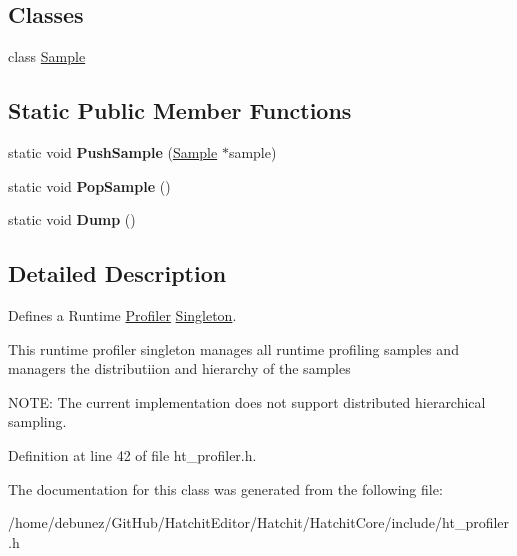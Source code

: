 \subsection*{Classes}
\begin{DoxyCompactItemize}
\item 
class \hyperlink{classHatchit_1_1Core_1_1Profiler_1_1Sample}{Sample}
\end{DoxyCompactItemize}
\subsection*{Static Public Member Functions}
\begin{DoxyCompactItemize}
\item 
static void {\bfseries Push\+Sample} (\hyperlink{classHatchit_1_1Core_1_1Profiler_1_1Sample}{Sample} $\ast$sample)\hypertarget{classHatchit_1_1Core_1_1Profiler_a0f8f9eb4507261bef45527995e6a3c19}{}\label{classHatchit_1_1Core_1_1Profiler_a0f8f9eb4507261bef45527995e6a3c19}

\item 
static void {\bfseries Pop\+Sample} ()\hypertarget{classHatchit_1_1Core_1_1Profiler_af693980d00fc01b6d379ec1b3019b37b}{}\label{classHatchit_1_1Core_1_1Profiler_af693980d00fc01b6d379ec1b3019b37b}

\item 
static void {\bfseries Dump} ()\hypertarget{classHatchit_1_1Core_1_1Profiler_af88668910468a12f2aa7383ea444d14c}{}\label{classHatchit_1_1Core_1_1Profiler_af88668910468a12f2aa7383ea444d14c}

\end{DoxyCompactItemize}


\subsection{Detailed Description}
Defines a Runtime \hyperlink{classHatchit_1_1Core_1_1Profiler}{Profiler} \hyperlink{classHatchit_1_1Core_1_1Singleton}{Singleton}. 

This runtime profiler singleton manages all runtime profiling samples and managers the distributiion and hierarchy of the samples

N\+O\+TE\+: The current implementation does not support distributed hierarchical sampling. 

Definition at line 42 of file ht\+\_\+profiler.\+h.



The documentation for this class was generated from the following file\+:\begin{DoxyCompactItemize}
\item 
/home/debunez/\+Git\+Hub/\+Hatchit\+Editor/\+Hatchit/\+Hatchit\+Core/include/ht\+\_\+profiler.\+h\end{DoxyCompactItemize}
